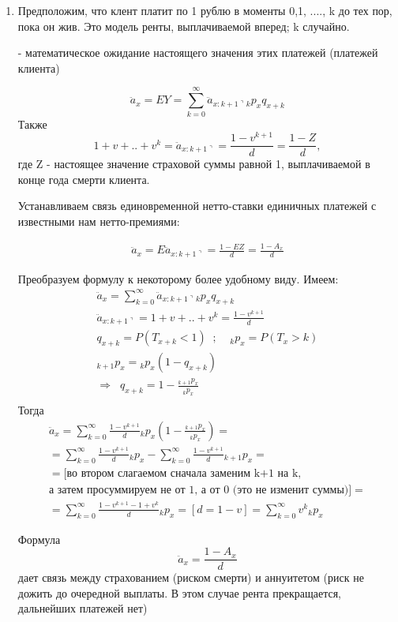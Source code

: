 \begin{enumerate}
	\item {}
	Предположим, что клент платит по 1 рублю в моменты 0,1, ...., k до тех пор, пока он жив. Это модель ренты, выплачиваемой вперед; k случайно.

	 - математическое ожидание настоящего значения этих платежей (платежей клиента)

	\[  \ddot{a}_x = EY = \sum\limits_{k=0}^{\infty}\ddot{a}_{x:k+1\urcorner}{}_kp_xq_{x+k} \]
	Также
	\[1+v+..+v^k = \ddot{a}_{x:k+1\urcorner}=\frac{1-v^{k+1}}{d}=\frac{1-Z}{d},\]
	где Z - настоящее значение страховой суммы равной 1, выплачиваемой в конце года смерти клиента.

	Устанавливаем связь единовременной нетто-ставки единичных платежей с известными нам нетто-премиями:

	\begin{gather*}
		\ddot{a}_x = E \ddot{a}_{x:k+1\urcorner} = \frac{1-EZ}{d}=\frac{1-A_x}{d}
	\end{gather*}
	\begin{mind}
		Преобразуем формулу к некоторому более удобному виду. Имеем:
		\begin{gather*}
			\ddot{a}_x = \sum\limits_{k=0}^{\infty}\ddot{a}_{x:k+1\urcorner}{}_kp_xq_{x+k} \\
			\ddot{a}_{x:k+1\urcorner} = 1+v+..+v^k = \frac{1-v^{k+1}}{d}\\
			q_{x+k} = P(T_{x+k}<1)\;\;;\;\;\;\;{}_kp_x = P(T_x>k)\\
			{}_{k+1}p_x={}_kp_x(1 - q_{x+k})\\
			\Rightarrow \;\;q_{x+k}=1- \frac{{}_{k+1}p_x}{{}_kp_x}\\
		\end{gather*}
		Тогда 
		\begin{gather*}
			\ddot{a}_{x} = \sum\limits_{k=0}^{\infty}\frac{1-v^{k+1}}{d}{}_kp_x(1- \frac{{}_{k+1}p_x}{{}_kp_x})=\\
			=\sum\limits_{k=0}^{\infty}\frac{1-v^{k+1}}{d}{}_kp_x - \sum\limits_{k=0}^{\infty}\frac{1-v^{k+1}}{d}{}_{k+1}p_x=\\
			=[\text{во втором слагаемом сначала заменим k+1 на k,}\\
			\text{а затем просуммируем не от 1, а от 0 (это не изменит суммы)}]=\\
			=\sum\limits_{k=0}^{\infty}\frac{1-v^{k+1}-1+v^{k}}{d}{}_kp_x =[d =1-v]= \sum\limits_{k=0}^{\infty}v^k{}_kp_x
		\end{gather*}
	\end{mind}
	\begin{remark}
		Формула
		\[  \ddot{a}_x =\frac{1-A_x}{d}\]
		дает связь между страхованием (риском смерти) и аннуитетом (риск не дожить до очередной выплаты. В этом случае рента прекращается, дальнейших платежей нет)
	\end{remark}


\end{enumerate}
